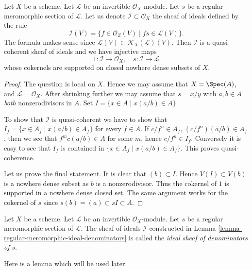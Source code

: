 \begin{lemma}
\label{lemma-regular-meromorphic-ideal-denominators}
Let $X$ be a scheme.
Let $\mathcal{L}$ be an invertible $\mathcal{O}_X$-module.
Let $s$ be a regular meromorphic section of $\mathcal{L}$.
Let us denote $\mathcal{I} \subset \mathcal{O}_X$ the
sheaf of ideals defined by the rule
$$
\mathcal{I}(V)
=
\{f \in \mathcal{O}_Z(V) \mid fs \in \mathcal{L}(V)\}.
$$
The formula makes sense since
$\mathcal{L}(V) \subset \mathcal{K}_X(\mathcal{L})(V)$.
Then $\mathcal{I}$ is a quasi-coherent sheaf of ideals and
we have injective maps
$$
1 : \mathcal{I} \longrightarrow \mathcal{O}_X,
\quad
s : \mathcal{I} \longrightarrow \mathcal{L}
$$
whose cokernels are supported on closed nowhere dense subsets of $X$.
\end{lemma}

\begin{proof}
The question is local on $X$.
Hence we may assume that $X = \Spec(A)$,
and $\mathcal{L} = \mathcal{O}_X$. After shrinking further
we may assume that $s = x/y$ with $a, b \in A$ {\it both}
nonzerodivisors in $A$. Set $I = \{x \in A \mid x(a/b) \in A\}$.

\medskip\noindent
To show that $\mathcal{I}$ is quasi-coherent we have to show
that $I_f = \{x \in A_f \mid x(a/b) \in A_f\}$ for every
$f \in A$. If $c/f^n \in A_f$, $(c/f^n)(a/b) \in A_f$, then we see
that $f^mc(a/b) \in A$ for some $m$, hence $c/f^n \in I_f$.
Conversely it is easy to see that $I_f$ is contained in
$\{x \in A_f \mid x(a/b) \in A_f\}$. This proves quasi-coherence.

\medskip\noindent
Let us prove the final statement. It is clear that $(b) \subset I$.
Hence $V(I) \subset V(b)$ is a nowhere dense subset as $b$ is
a nonzerodivisor. Thus the cokernel of $1$ is supported in a nowhere
dense closed set. The same argument works for the cokernel
of $s$ since $s(b) = (a) \subset sI \subset A$.
\end{proof}

\begin{definition}
\label{definition-regular-meromorphic-ideal-denominators}
Let $X$ be a scheme.
Let $\mathcal{L}$ be an invertible $\mathcal{O}_X$-module.
Let $s$ be a regular meromorphic section of $\mathcal{L}$.
The sheaf of ideals $\mathcal{I}$ constructed in
Lemma \ref{lemma-regular-meromorphic-ideal-denominators}
is called the {\it ideal sheaf of denominators of $s$}.
\end{definition}

\noindent
Here is a lemma which will be used later.

